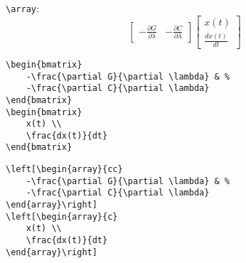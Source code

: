 \texttt{\large \textbackslash array}:
\begin{equation*} 
\left[\begin{array}{cc}
		-\frac{\partial G}{\partial \lambda} & %
		-\frac{\partial C}{\partial \lambda}
	\end{array}\right]
\left[\begin{array}{c}	
		x(t) \\
		\frac{dx(t)}{dt} 
	\end{array}\right]
\end{equation*}
%
%
\begin{verbatim} 
\begin{bmatrix}
	-\frac{\partial G}{\partial \lambda} & %
	-\frac{\partial C}{\partial \lambda}
\end{bmatrix}
\begin{bmatrix}	
	x(t) \\
	\frac{dx(t)}{dt} 
\end{bmatrix}
\end{verbatim}
%
\begin{verbatim} 
\left[\begin{array}{cc}
	-\frac{\partial G}{\partial \lambda} & %
	-\frac{\partial C}{\partial \lambda}
\end{array}\right]
\left[\begin{array}{c}	
	x(t) \\
	\frac{dx(t)}{dt} 
\end{array}\right]
\end{verbatim}
